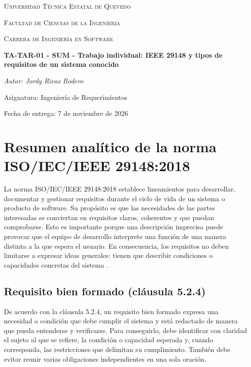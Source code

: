 \documentclass[12pt,a4paper]{article}
\begin{document}
\begin{titlepage}
    \centering
    {\scshape\LARGE Universidad Técnica Estatal de Quevedo \par}
    {\scshape\Large Facultad de Ciencias de la Ingeniería\par}
    {\scshape\large Carrera de Ingeniería en Software\par}
    \vspace{1.5cm}
    {\huge\bfseries TA-TAR-01 - SUM - Trabajo individual: IEEE 29148 y tipos de requisitos de un sistema conocido\par}
    \vspace{1cm}
    {\Large\itshape Autor: Jordy Rivas Bodero\par}
    {\Large Asignatura: Ingeniería de Requerimientos\par}
    \vfill
    {\large Fecha de entrega: 7 de noviembre de 2026\par}
\end{titlepage}

\renewcommand{\contentsname}{Índice}
\clearpage
\tableofcontents
\clearpage

\section{Resumen analítico de la norma ISO/IEC/IEEE 29148:2018}

La norma ISO/IEC/IEEE 29148:2018 establece lineamientos para desarrollar, documentar y gestionar requisitos durante el ciclo de vida de un sistema o producto de software. Su propósito es que las necesidades de las partes interesadas se conviertan en requisitos claros, coherentes y que puedan comprobarse. Esto es importante porque una descripción imprecisa puede provocar que el equipo de desarrollo interprete una función de una manera distinta a la que espera el usuario. En consecuencia, los requisitos no deben limitarse a expresar ideas generales: tienen que describir condiciones o capacidades concretas del sistema \cite{ieee29148}.

\subsection{Requisito bien formado (cláusula 5.2.4)}

De acuerdo con la cláusula 5.2.4, un requisito bien formado expresa una necesidad o condición que debe cumplir el sistema y está redactado de manera que pueda entenderse y verificarse. Para conseguirlo, debe identificar con claridad el sujeto al que se refiere, la condición o capacidad esperada y, cuando corresponda, las restricciones que delimitan su cumplimiento. También debe evitar reunir varias obligaciones independientes en una sola oración.
\end{document}
